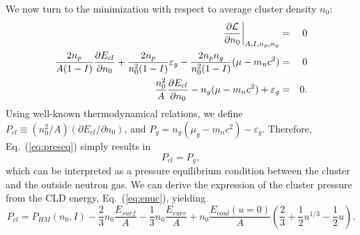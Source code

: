 We now turn to the minimization with respect to average cluster density $n_0$:
%
\begin{eqnarray}
  \frac{\partial \mathcal{L}}{\partial n_0}\bigg|_{A,I,n_p,n_g} &=& 0 \notag\\
  \frac{2n_p}{A(1-I)}\frac{\partial E_{cl}}{\partial n_0} +
  \frac{2n_p}{n_0^2(1-I)}\varepsilon_g -
  \frac{2n_pn_g}{n_0^2(1-I)}(\mu-m_nc^2) &=& 0 \notag\\
  \frac{n_0^2}{A}\frac{\partial E_{cl}}{\partial n_0} - n_g(\mu - m_nc^2) +
  \varepsilon_g &=& 0.\label{eq:preseq}
\end{eqnarray}
%
Using well-known thermodynamical relations, we define 
$P_{cl} \equiv (n_0^2/A)(\partial E_{cl}/\partial n_0)$, 
and $P_g = n_g(\mu_g-m_nc^2) - \varepsilon_g$. Therefore, Eq.~(\ref{eq:preseq}) 
simply results in
%
\begin{equation}
  P_{cl} = P_g,\label{eq:preseqq}
\end{equation}
%
which can be interpreted as a pressure equilibrium condition between the 
cluster and the outside neutron gas. We can derive the expression of the
cluster pressure from the CLD energy, Eq.~(\ref{eq:enuc}), yielding
%
\begin{equation}
  P_{cl} = P_{HM}(n_0,I) - \frac{2}{3}n_0\frac{E_{surf}}{A} -
  \frac{1}{3}n_0\frac{E_{curv}}{A} +
  n_0\frac{E_{coul}(u=0)}{A}\left(\frac{2}{3} + \frac{1}{2}u^{1/3} -
  \frac{1}{2}u\right).
\end{equation}
%

